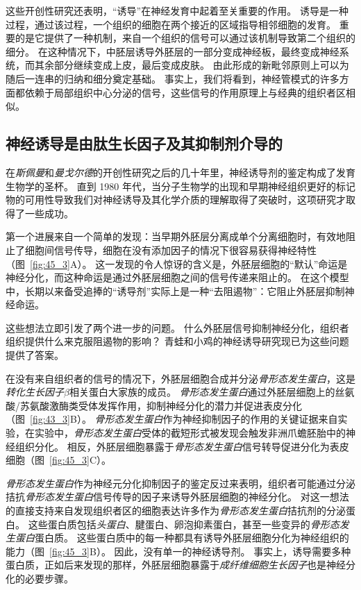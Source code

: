 这些开创性研究还表明，“诱导”在神经发育中起着至关重要的作用。
诱导是一种过程，通过该过程，一个组织的细胞在两个接近的区域指导相邻细胞的发育。
重要的是它提供了一种机制，来自一个组织的信号可以通过该机制导致第二个组织的细分。
在这种情况下，中胚层诱导外胚层的一部分变成神经板，最终变成神经系统，而其余部分继续变成上皮，最后变成皮肤。
由此形成的新毗邻原则上可以为随后一连串的归纳和细分奠定基础。
事实上，我们将看到，神经管模式的许多方面都依赖于局部组织中心分泌的信号，这些信号的作用原理上与经典的组织者区相似。



\subsection{神经诱导是由肽生长因子及其抑制剂介导的}

在\textit{斯佩曼}和\textit{曼戈尔德}的开创性研究之后的几十年里，神经诱导剂的鉴定构成了发育生物学的圣杯。
直到 1980 年代，当分子生物学的出现和早期神经组织更好的标记物的可用性导致我们对神经诱导及其化学介质的理解取得了突破时，这项研究才取得了一些成功。


第一个进展来自一个简单的发现：当早期外胚层分离成单个分离细胞时，有效地阻止了细胞间信号传导，细胞在没有添加因子的情况下很容易获得神经特性（图~\ref{fig:45_3}A）。
这一发现的令人惊讶的含义是，外胚层细胞的“默认”命运是神经分化，而这种命运是通过外胚层细胞之间的信号传递来阻止的。
在这个模型中，长期以来备受追捧的“诱导剂”实际上是一种“去阻遏物”：它阻止外胚层抑制神经命运。


这些想法立即引发了两个进一步的问题。
什么外胚层信号抑制神经分化，组织者组织提供什么来克服阻遏物的影响？
青蛙和小鸡的神经诱导研究现已为这些问题提供了答案。


在没有来自组织者的信号的情况下，外胚层细胞合成并分泌\textit{骨形态发生蛋白}，这是\textit{转化生长因子$\beta$}相关蛋白大家族的成员。
\textit{骨形态发生蛋白}通过外胚层细胞上的丝氨酸/苏氨酸激酶类受体发挥作用，抑制神经分化的潜力并促进表皮分化（图~\ref{fig:43_3}B）。
\textit{骨形态发生蛋白}作为神经抑制因子的作用的关键证据来自实验，在实验中，\textit{骨形态发生蛋白}受体的截短形式被发现会触发非洲爪蟾胚胎中的神经组织分化。
相反，外胚层细胞暴露于\textit{骨形态发生蛋白}信号转导促进分化为表皮细胞（图~\ref{fig:45_3}C）。


\textit{骨形态发生蛋白}作为神经元分化抑制因子的鉴定反过来表明，组织者可能通过分泌拮抗\textit{骨形态发生蛋白}信号传导的因子来诱导外胚层细胞的神经分化。
对这一想法的直接支持来自发现组织者区的细胞表达许多作为\textit{骨形态发生蛋白}拮抗剂的分泌蛋白。
这些蛋白质包括\textit{头蛋白}、腱蛋白、卵泡抑素蛋白，甚至一些变异的\textit{骨形态发生蛋白}蛋白质。
这些蛋白质中的每一种都具有诱导外胚层细胞分化为神经组织的能力（图~\ref{fig:45_3}B）。
因此，没有单一的神经诱导剂。
事实上，诱导需要多种蛋白质，正如后来发现的那样，外胚层细胞暴露于\textit{成纤维细胞生长因子}也是神经分化的必要步骤。


